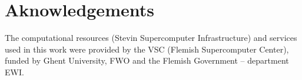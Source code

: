 \documentclass[10pt,letterpaper]{article}
\begin{document}
\section*{Aknowledgements}
The computational resources (Stevin Supercomputer Infrastructure) and
  services used in this work were provided by the VSC (Flemish Supercomputer
  Center), funded by Ghent University, FWO and the Flemish Government –
  department EWI.

\nolinenumbers

%
%
%
%
%
%
%

{}
\end{document}
